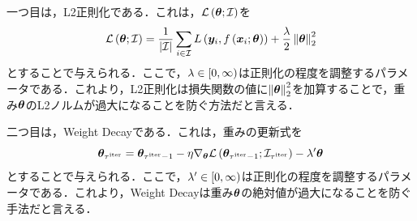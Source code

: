 \documentclass[12pt]{jarticle}
\numberwithin{equation}{section}    %
\numberwithin{figure}{section}      %
\numberwithin{table}{section}      %
\begin{document}
一つ目は，L2正則化である．これは，$\mathcal{L}\left(\bm{\theta}; \mathcal{I}\right)$を
\begin{equation}
    \label{sec3:eq:l2_reg}
    \mathcal{L}\left(\bm{\theta}; \mathcal{I}\right) = \frac{1}{|\mathcal{I}|} \sum_{i \in \mathcal{I}} L\left(\bm{y}_{i}, f\left(\bm{x}_{i}; \bm{\theta}\right)\right) + \frac{\lambda}{2} \left\|\bm{\theta}\right\|_{2}^{2}
\end{equation}
とすることで与えられる．ここで，$\lambda \in \left[0, \infty\right)$は正則化の程度を調整するパラメータである．これより，L2正則化は損失関数の値に$\left\|\bm{\theta}\right\|_{2}^{2}$を加算することで，重み$\bm{\theta}$のL2ノルムが過大になることを防ぐ方法だと言える．

二つ目は，Weight Decayである．これは，重みの更新式を
\begin{equation}
    \label{sec3:eq:weight_decay}
    \bm{\theta}_{\tau^{\text{iter}}} = \bm{\theta}_{\tau^{\text{iter}} - 1} - \eta \nabla_{\bm{\theta}} \mathcal{L}\left(\bm{\theta}_{\tau^{\text{iter}} - 1}; \mathcal{I}_{\tau^{\text{iter}}}\right) - \lambda' \bm{\theta}
\end{equation}
とすることで与えられる．ここで，$\lambda' \in \left[0, \infty\right)$は正則化の程度を調整するパラメータである．これより，Weight Decayは重み$\bm{\theta}$の絶対値が過大になることを防ぐ手法だと言える．
\end{document}

